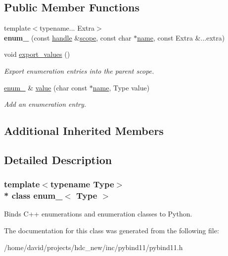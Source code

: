 \subsection*{Public Member Functions}
\begin{DoxyCompactItemize}
\item 
{\footnotesize template$<$typename... Extra$>$ }\\{\bfseries enum\+\_\+} (const \hyperlink{classhandle}{handle} \&\hyperlink{structscope}{scope}, const char $\ast$\hyperlink{structname}{name}, const Extra \&...extra)\hypertarget{classenum___ade0309e17b0ccdf48496c04f0409e3d5}{}\label{classenum___ade0309e17b0ccdf48496c04f0409e3d5}

\item 
void \hyperlink{classenum___a29873c97ec59f5157d453512cabf3b6d}{export\+\_\+values} ()\hypertarget{classenum___a29873c97ec59f5157d453512cabf3b6d}{}\label{classenum___a29873c97ec59f5157d453512cabf3b6d}

\begin{DoxyCompactList}\small\item\em Export enumeration entries into the parent scope. \end{DoxyCompactList}\item 
\hyperlink{classenum__}{enum\+\_\+} \& \hyperlink{classenum___aabffafa8c167a1c89f8d136533fc99af}{value} (char const $\ast$\hyperlink{structname}{name}, Type value)\hypertarget{classenum___aabffafa8c167a1c89f8d136533fc99af}{}\label{classenum___aabffafa8c167a1c89f8d136533fc99af}

\begin{DoxyCompactList}\small\item\em Add an enumeration entry. \end{DoxyCompactList}\end{DoxyCompactItemize}
\subsection*{Additional Inherited Members}


\subsection{Detailed Description}
\subsubsection*{template$<$typename Type$>$\\*
class enum\+\_\+$<$ Type $>$}

Binds C++ enumerations and enumeration classes to Python. 

The documentation for this class was generated from the following file\+:\begin{DoxyCompactItemize}
\item 
/home/david/projects/hdc\+\_\+new/inc/pybind11/pybind11.\+h\end{DoxyCompactItemize}
